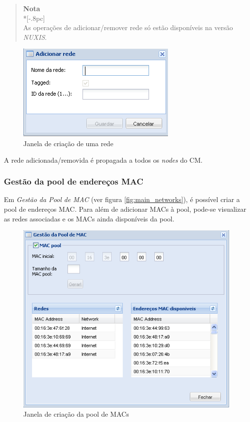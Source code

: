 \begin{quote}
	{\large \bf Nota} \\*[-.8pc]
	\underline{\hspace{6in}} \\
	As operações de adicionar/remover rede só estão disponíveis na versão \emph{NUXIS}.
\end{quote}


\begin{figure}[H]
	\begin{center}
	\includegraphics[scale=0.5]{screenshots/network_create.png}
	\caption{Janela de criação de uma rede}
	\label{fig:network_create}
	\end{center}
\end{figure}

A rede adicionada/removida é propagada a todos os \emph{nodes} do CM.


\subsubsection{Gestão da pool de endereços MAC}
\label{sec:mac_pool}

Em \emph{Gestão da Pool de MAC} (ver figura \ref{fig:main_networks}), é possível criar a pool de endereços MAC.
Para além de adicionar MACs à pool, pode-se visualizar as redes associadas e os MACs ainda disponíveis da pool.

\begin{figure}[H]
	\begin{center}
	\includegraphics[scale=0.5]{screenshots/networks_macpool.png}
	\caption{Janela de criação da pool de MACs}
	\label{fig:networks_macpool}
	\end{center}
\end{figure}


